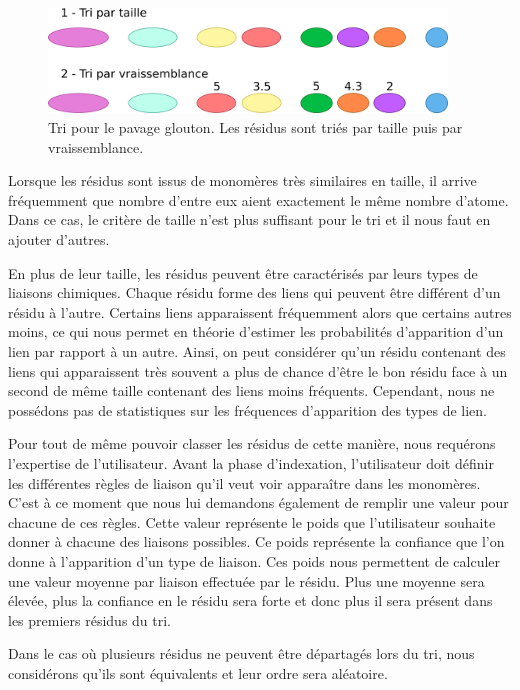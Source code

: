 \begin{figure}
  \begin{center}
    \includegraphics[width=400px]{Figures/s2m/pavage/tri.png}
    \caption{\label{tri_glouton}Tri pour le pavage glouton.
    Les résidus sont triés par taille puis par vraissemblance.}
  \end{center}
\end{figure}

Lorsque les résidus sont issus de monomères très similaires en taille, il arrive fréquemment que nombre d'entre eux
aient exactement le même nombre d'atome.
Dans ce cas, le critère de taille n'est plus suffisant pour le tri et il nous faut en ajouter d'autres.

En plus de leur taille, les résidus peuvent être caractérisés par leurs types de liaisons chimiques.
Chaque résidu forme des liens qui peuvent être différent d'un résidu à l'autre.
Certains liens apparaissent fréquemment alors que certains autres moins, ce qui nous permet en théorie d'estimer les
probabilités d'apparition d'un lien par rapport à un autre.
Ainsi, on peut considérer qu'un résidu contenant des liens qui apparaissent très souvent a plus de chance d'être le bon résidu
face à un second de même taille contenant des liens moins fréquents.
Cependant, nous ne possédons pas de statistiques sur les fréquences d'apparition des types de lien.

Pour tout de même pouvoir classer les résidus de cette manière, nous requérons l'expertise de l'utilisateur.
Avant la phase d'indexation, l'utilisateur doit définir les différentes règles de liaison qu'il veut voir apparaître dans les monomères.
C'est à ce moment que nous lui demandons également de remplir une valeur pour chacune de ces règles.
Cette valeur représente le poids que l'utilisateur souhaite donner à chacune des liaisons possibles.
Ce poids représente la confiance que l'on donne à l'apparition d'un type de liaison.
Ces poids nous permettent de calculer une valeur moyenne par liaison effectuée par le résidu.
Plus une moyenne sera élevée, plus la confiance en le résidu sera forte et donc plus il sera présent dans les premiers résidus du tri.

Dans le cas où plusieurs résidus ne peuvent être départagés lors du tri, nous considérons qu'ils sont équivalents et leur ordre sera aléatoire.


